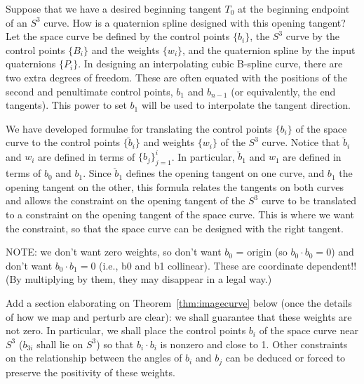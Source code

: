 \documentclass[12pt]{article}
\begin{document}
Suppose that we have a desired beginning tangent $T_0$ 
at the beginning endpoint of an $S^3$ curve. 
How is a quaternion spline designed with this opening tangent?
Let the space curve be defined by the control points $\{b_i\}$,
the $S^3$ curve by the control points $\{B_i\}$ and the weights $\{w_i\}$,
and the quaternion spline by the input quaternions $\{P_i\}$.
In designing an interpolating cubic B-spline curve, 
there are two extra degrees of freedom.
These are often equated with the positions of the second and penultimate control points,
$b_1$ and $b_{n-1}$ (or equivalently, the end tangents).
This power to set $b_1$ will be used to interpolate the tangent direction.

We have developed formulae for translating the control points $\{b_i\}$ of the space
curve to the control points $\{\breve{b}_i\}$ and weights $\{w_i\}$ of the $S^3$ curve.
Notice that $\breve{b}_i$ and $w_i$ are defined in terms of $\{b_j\}_{j=1}^i$.
In particular, $\breve{b}_1$ and $w_1$ are defined in terms of $b_0$ and $b_1$.
Since $\breve{b}_1$ defines the opening tangent on one curve, 
and $b_1$ the opening tangent on the other,
this formula relates the tangents on both curves and allows the constraint on the
opening tangent of the $S^3$ curve to be translated to a constraint on the opening
tangent of the space curve.
This is where we want the constraint,
so that the space curve can be designed with the right tangent.

NOTE: we don't want zero weights, so don't want $b_0$ = origin (so $b_0 \cdot b_0 = 0$)
and don't want $b_0 \cdot b_1 = 0$ (i.e., b0 and b1 collinear).
These are coordinate dependent!!
(By multiplying by them, they may disappear in a legal way.)

Add a section elaborating on Theorem~\ref{thm:imagecurve} below 
(once the details of how we map and perturb are clear):
we shall guarantee that these weights are not zero.
In particular, we shall place the control points $b_i$ of the space curve
near $S^3$ ($b_{3i}$ shall lie on $S^3$) so that $b_i \cdot b_i$ is nonzero 
and close to 1.
Other constraints on the relationship between the angles of $b_i$ and $b_j$ can be 
deduced or forced to preserve the positivity of these weights.
\end{document}
